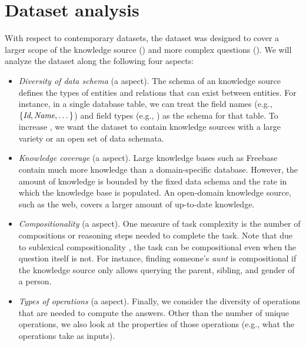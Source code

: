 \section{Dataset analysis}\label{sec:wtq-analysis}

With respect to contemporary datasets,
the \wtq dataset was designed to cover
a larger scope of the knowledge source (\Breadth)
and more complex questions (\Depth).
We will analyze the dataset along the following four aspects:

\begin{itemize}
\item \emph{Diversity of data schema} (a \Breadth aspect).
The schema of an knowledge source defines the types of entities
and relations that can exist between entities.
For instance, in a single database table,
we can treat the field names
(e.g., $\{\emph{Id}, \emph{Name}, \dots\}$)
and field types (e.g., )
as the schema for that table.
To increase \Breadth, we want the dataset to
contain knowledge sources with a large variety or an open set
of data schemata.

\item \emph{Knowledge coverage} (a \Breadth aspect).
Large knowledge bases
such as Freebase \cite{freebase2013dump}
contain much more knowledge than a
domain-specific database.
However, the amount of knowledge is bounded by
the fixed data schema
and the rate in which the knowledge base is populated.
An open-domain knowledge source,
such as the web,
covers a larger amount of up-to-date knowledge.

\item \emph{Compositionality} (a \Depth aspect).
One measure of task complexity
is the number of compositions or reasoning steps needed
to complete the task.
Note that due to sublexical compositionality
\cite{wang2015overnight},
the task can be compositional
even when the question itself is not.
For instance, finding someone's \emph{aunt} is compositional
if the knowledge source only allows querying
the parent, sibling, and gender of a person.

\item \emph{Types of operations} (a \Depth aspect).
Finally, we consider the diversity of operations
that are needed to compute the answers.
Other than the number of unique operations,
we also look at the properties of those operations
(e.g., what the operations take as inputs).

\end{itemize}

